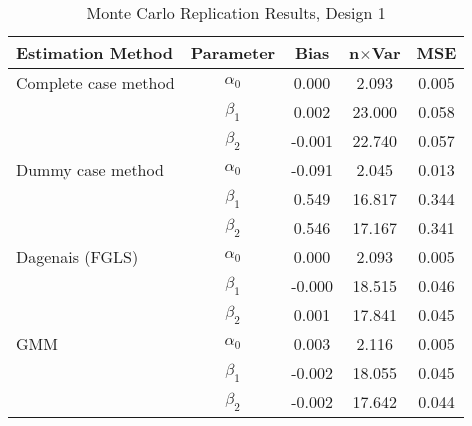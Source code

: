 \begin{table}
\centering
\caption{Monte Carlo Replication Results, Design 1}
\label{table:MCReplicationResultsDesign1}
\begin{tabular}{lcccc}
\toprule
Estimation Method & Parameter & Bias & n$\times$Var & MSE \\
\midrule
Complete case method & $\alpha_0$ & 0.000 & 2.093 & 0.005 \\
 & $\beta_1$ & 0.002 & 23.000 & 0.058 \\
 & $\beta_2$ & -0.001 & 22.740 & 0.057 \\
Dummy case method & $\alpha_0$ & -0.091 & 2.045 & 0.013 \\
 & $\beta_1$ & 0.549 & 16.817 & 0.344 \\
 & $\beta_2$ & 0.546 & 17.167 & 0.341 \\
Dagenais (FGLS) & $\alpha_0$ & 0.000 & 2.093 & 0.005 \\
 & $\beta_1$ & -0.000 & 18.515 & 0.046 \\
 & $\beta_2$ & 0.001 & 17.841 & 0.045 \\
GMM & $\alpha_0$ & 0.003 & 2.116 & 0.005 \\
 & $\beta_1$ & -0.002 & 18.055 & 0.045 \\
 & $\beta_2$ & -0.002 & 17.642 & 0.044 \\
\bottomrule
\end{tabular}
\end{table}
